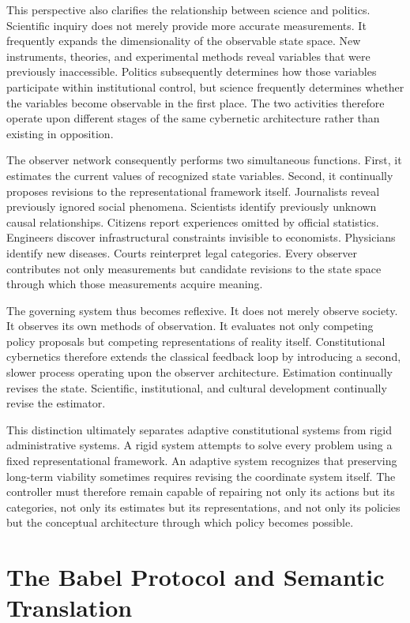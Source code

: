\documentclass[12pt,a4paper]{article}
\begin{document}
This perspective also clarifies the relationship between science and politics. Scientific inquiry does not merely provide more accurate measurements. It frequently expands the dimensionality of the observable state space. New instruments, theories, and experimental methods reveal variables that were previously inaccessible. Politics subsequently determines how those variables participate within institutional control, but science frequently determines whether the variables become observable in the first place. The two activities therefore operate upon different stages of the same cybernetic architecture rather than existing in opposition.

The observer network consequently performs two simultaneous functions. First, it estimates the current values of recognized state variables. Second, it continually proposes revisions to the representational framework itself. Journalists reveal previously ignored social phenomena. Scientists identify previously unknown causal relationships. Citizens report experiences omitted by official statistics. Engineers discover infrastructural constraints invisible to economists. Physicians identify new diseases. Courts reinterpret legal categories. Every observer contributes not only measurements but candidate revisions to the state space through which those measurements acquire meaning.

The governing system thus becomes reflexive. It does not merely observe society. It observes its own methods of observation. It evaluates not only competing policy proposals but competing representations of reality itself. Constitutional cybernetics therefore extends the classical feedback loop by introducing a second, slower process operating upon the observer architecture. Estimation continually revises the state. Scientific, institutional, and cultural development continually revise the estimator.

This distinction ultimately separates adaptive constitutional systems from rigid administrative systems. A rigid system attempts to solve every problem using a fixed representational framework. An adaptive system recognizes that preserving long-term viability sometimes requires revising the coordinate system itself. The controller must therefore remain capable of repairing not only its actions but its categories, not only its estimates but its representations, and not only its policies but the conceptual architecture through which policy becomes possible.

\section{The Babel Protocol and Semantic Translation}
\end{document}
